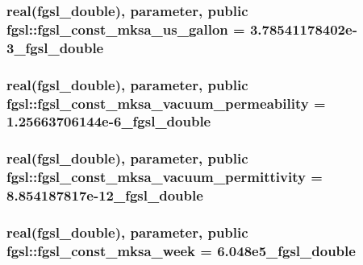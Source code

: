 \subsubsection[{fgsl\+\_\+const\+\_\+mksa\+\_\+us\+\_\+gallon}]{\setlength{\rightskip}{0pt plus 5cm}real({\bf fgsl\+\_\+double}), parameter, public fgsl\+::fgsl\+\_\+const\+\_\+mksa\+\_\+us\+\_\+gallon = 3.\+78541178402e-\/3\+\_\+fgsl\+\_\+double}\label{namespacefgsl_a9c8e297dc4a0fa63d97e1c130cc5248a}
\hypertarget{namespacefgsl_a16aee30f6ddf44068a051e80be1f1e0e}{}
\subsubsection[{fgsl\+\_\+const\+\_\+mksa\+\_\+vacuum\+\_\+permeability}]{\setlength{\rightskip}{0pt plus 5cm}real({\bf fgsl\+\_\+double}), parameter, public fgsl\+::fgsl\+\_\+const\+\_\+mksa\+\_\+vacuum\+\_\+permeability = 1.\+25663706144e-\/6\+\_\+fgsl\+\_\+double}\label{namespacefgsl_a16aee30f6ddf44068a051e80be1f1e0e}
\hypertarget{namespacefgsl_a74a2728881184d5037b397e55d24411d}{}
\subsubsection[{fgsl\+\_\+const\+\_\+mksa\+\_\+vacuum\+\_\+permittivity}]{\setlength{\rightskip}{0pt plus 5cm}real({\bf fgsl\+\_\+double}), parameter, public fgsl\+::fgsl\+\_\+const\+\_\+mksa\+\_\+vacuum\+\_\+permittivity = 8.\+854187817e-\/12\+\_\+fgsl\+\_\+double}\label{namespacefgsl_a74a2728881184d5037b397e55d24411d}
\hypertarget{namespacefgsl_aecb67f391facbac682484e9d352dac5e}{}
\subsubsection[{fgsl\+\_\+const\+\_\+mksa\+\_\+week}]{\setlength{\rightskip}{0pt plus 5cm}real({\bf fgsl\+\_\+double}), parameter, public fgsl\+::fgsl\+\_\+const\+\_\+mksa\+\_\+week = 6.\+048e5\+\_\+fgsl\+\_\+double}\label{namespacefgsl_aecb67f391facbac682484e9d352dac5e}
\hypertarget{namespacefgsl_a822a621129f787917e82b140d0814b72}{}
